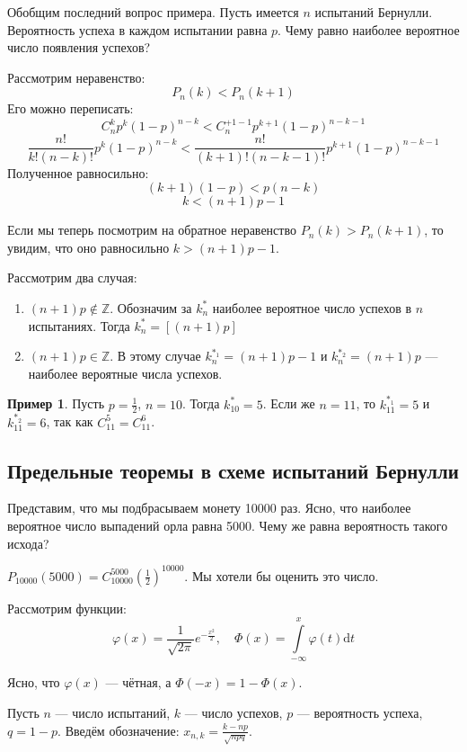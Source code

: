 \documentclass[11pt,openany,a4paper]{scrartcl}
\theoremstyle{plain}
\theoremstyle{definition}
\newtheorem{example}[theorem]{Пример}
\newcommand\mb{\mathbb}
\begin{document}
Обобщим последний вопрос примера.
Пусть имеется $n$ испытаний Бернулли. Вероятность успеха в каждом испытании равна $p$.
Чему равно наиболее вероятное число появления успехов?

Рассмотрим неравенство: 
$$
P_n(k) < P_n(k+1)
$$
Его можно переписать:
$$
C_n^k p^k(1-p)^{n-k} < C_n^{+1-1} p^{k+1} (1-p)^{n-k-1}
$$
$$
\frac{n!}{k! (n-k)!} p^k (1-p)^{n-k} < \frac{n!}{(k+1)!(n-k-1)!} p^{k+1}(1-p)^{n-k-1}
$$
Полученное равносильно:
$$
(k+1)(1-p) < p(n-k)
$$
$$
k < (n+1)p - 1
$$

Если мы теперь посмотрим на обратное неравенство $P_n(k) > P_n(k+1)$, то увидим, что
оно равносильно $k > (n+1)p - 1$.

Рассмотрим два случая:
\begin{enumerate}
    \item $(n+1)p \notin \mb Z$. Обозначим за $k_n^\ast$ наиболее вероятное число
    успехов в $n$ испытаниях. Тогда $k_n^\ast=[(n+1)p]$
    \item $(n+1)p \in \mb Z$. В этому случае $k_n^{\ast_1} = (n+1)p - 1$ и
    $k_n^{\ast_2} = (n+1)p$ — наиболее вероятные числа успехов.
\end{enumerate}

\begin{example}
    Пусть $p = \frac{1}{2}$, $n = 10$. Тогда $k_{10}^\ast = 5$. Если же $n = 11$, то
    $k_{11}^{\ast_1} = 5$ и $k_{11}^{\ast_2} = 6$, так как $C_{11}^5 = C_{11}^6$.
\end{example}

\subsection{Предельные теоремы в схеме испытаний Бернулли}

Представим, что мы подбрасываем монету 10000 раз. Ясно, что наиболее вероятное число 
выпадений орла равна 5000. Чему же равна вероятность такого исхода?

$P_{10000}(5000) = C_{10000}^{5000}(\frac{1}{2})^{10000}$. Мы хотели бы оценить это 
число.

Рассмотрим функции:
$$
\varphi(x) = \frac{1}{\sqrt{2\pi}}e^{-\frac{x^2}{2}},
\quad \Phi(x) = \int\limits_{-\infty}^x \varphi(t)\mathrm dt
$$

Ясно, что $\varphi(x)$ — чётная, а $\Phi(-x) = 1 -\Phi(x)$.

Пусть $n$ — число испытаний, $k$ — число успехов, $p$ — вероятность успеха, $q=1-p$.
Введём обозначение: $x_{n,k} = \frac{k - np}{\sqrt{npq}}$.
\end{document}
